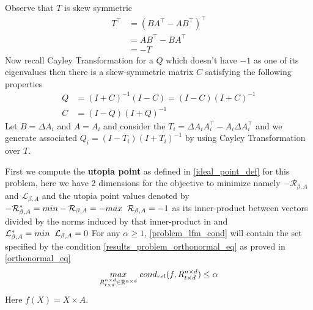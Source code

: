 Observe that $T$ is skew symmetric
\begin{equation}
\begin{aligned}
    T^\top &= (BA^\top- AB^\top)^\top\\
    &= AB^\top - BA^\top \\
    &= -T
\end{aligned}
\end{equation}
Now recall Cayley Transformation for a $Q$ which doesn't have $-1$ as one of its eigenvalues then there is a skew-symmetric matrix $C$ satisfying the following properties
\begin{equation} \label{cayley-transformation} 
\begin{aligned}
    Q &= (I+C)^{-1}(I-C) = (I-C)(I+C)^{-1} \\
    C &= (I-Q)(I+Q)^{-1}
\end{aligned}
\end{equation}
Let $B = \Delta A_i$ and $A = A_i$ and consider the $T_i = \Delta A_iA_i^\top- A_i\Delta A_i^\top$ and we generate associated $Q_i = (I-T_i)(I+T_i)^{-1}$ by using Cayley Transformation over $T$.

First we compute the \textbf{utopia point} as defined in \ref{ideal_point_def} for this problem, here we have 2 dimensions for the objective to minimize namely $-\mathcal{R}_{\beta, A}$ and $\mathcal{L}_{\beta, A}$ and the utopia point values denoted by $-\mathcal{R}_{\beta, A}^* = min -\mathcal{R}_{\beta, A}  = - max\hspace{2mm} \mathcal{R}_{\beta, A} =  - 1 $ as its inner-product between vectors divided by the norms induced by that inner-product in and $\mathcal{L}_{\beta, A}^* =min \hspace{2mm} \mathcal{L}_{\beta, A} = 0$ 
For any $\alpha \ge 1$, \ref{problem_lfm_cond} will contain the set specified by the condition \ref{results_problem_orthonormal_eq} as proved in \ref{orthonormal_eq}
\begin{equation} \label{problem_lfm_cond}
\underset{R^{n\times d}_{t\times d} \in \mathbb{R}^{n\times d}}{max}\hspace{1mm} cond_{rel}(f,R^{n\times d}_{t\times d}) \le \alpha
\end{equation}
Here $f(X) = X\times A$.





